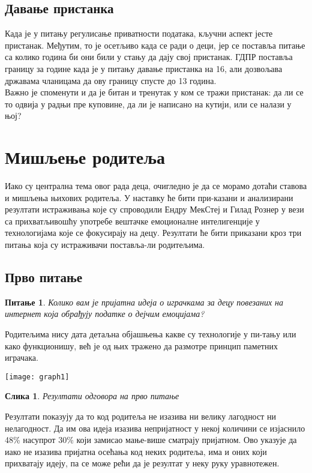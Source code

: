 \documentclass{article}
\newtheorem{question}{Питање}
\newtheorem{image}{Слика}
\begin{document}
\subsection{Давање пристанка}
Када је у питању регулисање приватности података, кључни аспект јесте пристанак. Међутим, то је осетљиво када се ради о деци, јер се поставља питање са колико година би они били у стању да дају свој пристанак. ГДПР поставља границу за године када је у питању давање пристанка на 16, али дозвољава државама чланицама да ову границу спусте до 13 година. \\
Важно је споменути и да је битан и тренутак у ком се тражи пристанак: да ли се то одвија у радњи пре куповине, да ли је написано на кутији, или се налази у њој?

\section{Мишљење родитеља}
Иако су централна тема овог рада деца, очигледно је да се морамо дотаћи ставова и мишљења њихових родитеља. У наставку ће бити при-казани и анализирани резултати истраживања које су спроводили Ендру МекСтеј и Гилад Рознер у вези са прихватљивошћу употребе вештачке емоционалне интелигенције у технологијама које се фокусирају на децу. Резултати ће бити приказани кроз три питања која су истраживачи поставља-ли родитељима.

\subsection{Прво питање}
\begin{question}
Колико вам је пријатна идеја о играчкама за децу повезаних на интернет која обрађују податке о дејчим емоцијама?
\end{question}

Родитељима нису дата детаљна објашњења какве су технологије у пи-тању или како функционишу, већ је од њих тражено да размотре принцип паметних играчака.

\texttt{[image: graph1]}
\begin{image}
\centering
Резултати одговора на прво питање
\end{image}

Резултати показују да то код родитеља не изазива ни велику лагодност ни нелагодност. Да им ова идеја изазива непријатност у некој количини се изјаснило 48\% насупрот 30\% који замисао мање-више сматрају пријатном. Ово указује да иако не изазива пријатна осећања код неких родитеља, има и оних који прихватају идеју, па се може рећи да је резултат у неку руку уравнотежен.
\end{document}
